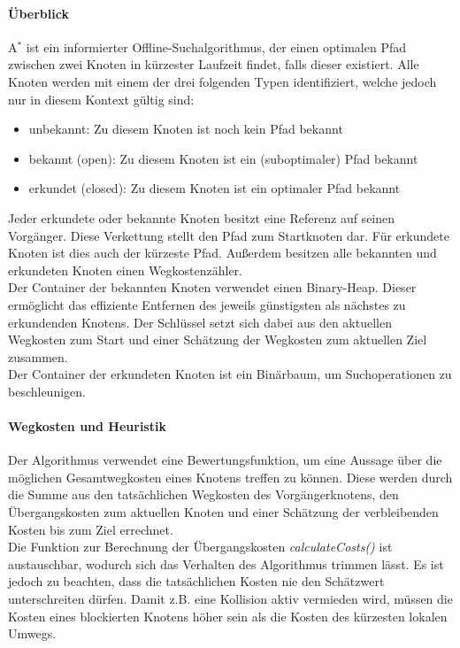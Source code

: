 \documentclass[10pt,a4paper]{article}
\begin{document}
		\paragraph{Überblick}
			A$^\ast$ ist ein informierter Offline-Suchalgorithmus, der einen optimalen Pfad zwischen zwei Knoten in kürzester 
			Laufzeit findet, falls dieser existiert. Alle Knoten werden mit einem der drei folgenden Typen 
			identifiziert, welche jedoch nur in diesem Kontext gültig sind:
			\begin{itemize}
				\item unbekannt: Zu diesem Knoten ist noch kein Pfad bekannt
				\item bekannt (open): Zu diesem Knoten ist ein (suboptimaler) Pfad bekannt
				\item erkundet (closed): Zu diesem Knoten ist ein optimaler Pfad bekannt
			\end{itemize}

			Jeder erkundete oder bekannte Knoten besitzt eine Referenz auf seinen Vorgänger. Diese Verkettung stellt den 
			Pfad zum Startknoten dar. Für erkundete Knoten ist dies auch der kürzeste Pfad. Außerdem besitzen alle 
			bekannten und erkundeten Knoten einen Wegkostenzähler. \\
			Der Container der bekannten Knoten verwendet einen Binary-Heap. Dieser ermöglicht das effiziente Entfernen
			des jeweils günstigsten als nächstes zu erkundenden Knotens. Der Schlüssel setzt sich dabei aus den 
			aktuellen Wegkosten zum Start und einer Schätzung der Wegkosten zum aktuellen Ziel zusammen. \\
			Der Container der erkundeten Knoten ist ein Binärbaum, um Suchoperationen zu beschleunigen.
		\paragraph{Wegkosten und Heuristik}
			Der Algorithmus verwendet eine Bewertungsfunktion, um eine Aussage über die möglichen Gesamtwegkosten eines 
			Knotens treffen zu können. Diese werden durch die Summe aus den tatsächlichen Wegkosten des Vorgängerknotens, 
			den Übergangskosten zum aktuellen Knoten und einer Schätzung der verbleibenden Kosten bis zum Ziel 
			errechnet. \\

			Die Funktion zur Berechnung der Übergangskosten \textit{calculateCosts()} ist austauschbar, wodurch sich das
			Verhalten des Algorithmus trimmen lässt. Es ist jedoch zu beachten, dass die tatsächlichen Kosten nie den
			Schätzwert unterschreiten dürfen. Damit z.B. eine Kollision aktiv vermieden wird, müssen die Kosten eines
			blockierten Knotens höher sein als die Kosten des kürzesten lokalen Umwegs. \\
\end{document}
